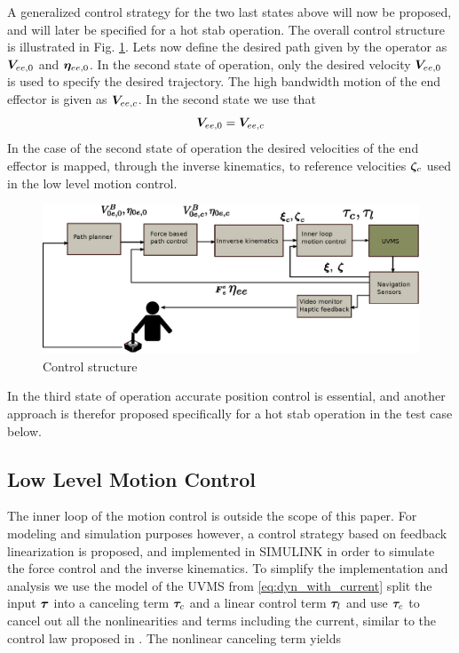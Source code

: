 A generalized control strategy for the two last states above will now  be proposed, and will later be specified for a hot stab operation. The overall control structure is illustrated in Fig. \ref{fig:control_structure}. Lets now define the desired path given by the operator as $\boldsymbol V_{ee,0}$ and $\boldsymbol \eta_{ee,0}$. In the second state of operation, only the desired velocity $\boldsymbol V_{ee,0}$ is used to specify the desired trajectory. The high bandwidth motion of the end effector is given as $\boldsymbol V_{ee,c}$. In the second state we use that 
$$\boldsymbol V_{ee,0} = \boldsymbol V_{ee,c} $$ 
In the case of the second state of operation the desired velocities of the end effector is mapped, through the inverse kinematics, to reference velocities $\boldsymbol \zeta_{c}$ used in the low level motion control.
\begin{figure}[h!]
	\centering
	\includegraphics[scale=0.9]{./figures/control_structure.eps}
	\caption{Control structure}
	\label{fig:control_structure}
\end{figure}
In the third state of operation accurate position control is essential, and another approach is therefor proposed specifically for a hot stab operation in the test case below. 

\subsection{Low Level Motion Control}
The inner loop of the motion control is outside the scope of this paper. For modeling and simulation purposes however, a control strategy based on feedback linearization is proposed, and implemented in SIMULINK in order to 
simulate the force control and the inverse kinematics. To simplify the implementation and analysis we use the model of the UVMS from \eqref{eq:dyn_with_current} split the input $\boldsymbol \tau$ into a canceling term $\boldsymbol \tau_c$ and a 
linear control term $\boldsymbol \tau_l$ and use $\boldsymbol \tau_c$ to cancel out all the nonlinearities and terms including the current, similar to the control law proposed in \cite{foss_schjolberg_modelling}. The nonlinear canceling term yields


